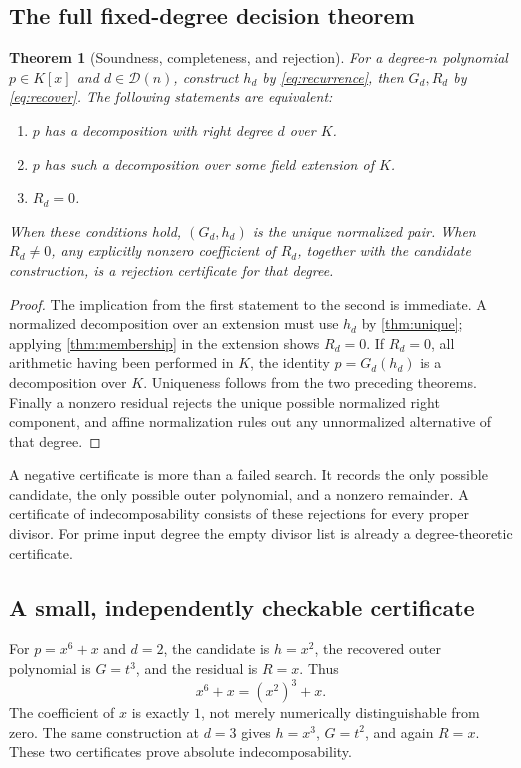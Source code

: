 \documentclass[11pt,a4paper]{article}
\newtheorem{theorem}{Theorem}[section]
\theoremstyle{definition}
\newcommand{\calD}{\mathcal D}
\begin{document}
\subsection{The full fixed-degree decision theorem}
\begin{theorem}[Soundness, completeness, and rejection]\label{thm:decision}
For a degree-$n$ polynomial $p\in K[x]$ and $d\in\calD(n)$, construct $h_d$ by \eqref{eq:recurrence}, then $G_d,R_d$ by \eqref{eq:recover}. The following statements are equivalent:
\begin{enumerate}
\item $p$ has a decomposition with right degree $d$ over $K$.
\item $p$ has such a decomposition over some field extension of $K$.
\item $R_d=0$.
\end{enumerate}
When these conditions hold, $(G_d,h_d)$ is the unique normalized pair. When $R_d\ne0$, any explicitly nonzero coefficient of $R_d$, together with the candidate construction, is a rejection certificate for that degree.
\end{theorem}
\begin{proof}
The implication from the first statement to the second is immediate. A normalized decomposition over an extension must use $h_d$ by \cref{thm:unique}; applying \cref{thm:membership} in the extension shows $R_d=0$. If $R_d=0$, all arithmetic having been performed in $K$, the identity $p=G_d(h_d)$ is a decomposition over $K$. Uniqueness follows from the two preceding theorems. Finally a nonzero residual rejects the unique possible normalized right component, and affine normalization rules out any unnormalized alternative of that degree.
\end{proof}

A negative certificate is more than a failed search. It records the only possible candidate, the only possible outer polynomial, and a nonzero remainder. A certificate of indecomposability consists of these rejections for every proper divisor. For prime input degree the empty divisor list is already a degree-theoretic certificate.

\subsection{A small, independently checkable certificate}
For $p=x^6+x$ and $d=2$, the candidate is $h=x^2$, the recovered outer polynomial is $G=t^3$, and the residual is $R=x$. Thus
\[
 x^6+x=(x^2)^3+x.
\]
The coefficient of $x$ is exactly $1$, not merely numerically distinguishable from zero. The same construction at $d=3$ gives $h=x^3$, $G=t^2$, and again $R=x$. These two certificates prove absolute indecomposability.
\end{document}
